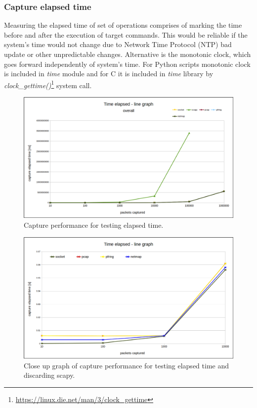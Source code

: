 \documentclass[12pt,a4paper,twoside]{report}
\begin{document}
			\subsubsection*{Capture elapsed time} \label{analysis:testing:results:timed}
				Measuring the elapsed time of set of operations comprises of marking the time before and after the execution of target commands. This would be reliable if the system's time would not change due to Network Time Protocol (NTP) bad update or other unpredictable changes. Alternative is the monotonic clock, which goes forward independently of system's time. For Python scripts monotonic clock is included in \emph{time} module and for C it is included in \emph{time} library by \emph{clock\_gettime()}\footnote{\url{https://linux.die.net/man/3/clock_gettime}} system call.\par
				\begin{figure}[h]
					\centering
					\includegraphics[scale=0.39]{overall_speed_line-graph}
					\caption{Capture performance for testing elapsed time.}
					\label{figure:tests:alltimed}
				\end{figure}
				\begin{figure}[h]
					\centering
					\includegraphics[scale=0.39]{closeup_speed_line-graph}
					\caption{Close up graph of capture performance for testing elapsed time and discarding scapy.}
					\label{figure:tests:closetimed}
				\end{figure}
\end{document}
